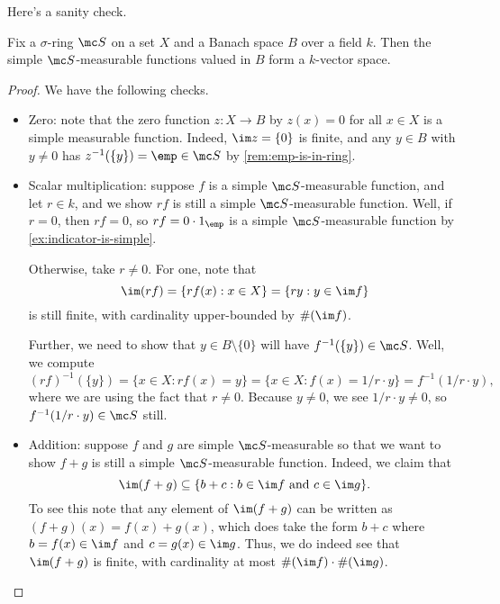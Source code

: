 \documentclass[../notes.tex]{subfiles}
\begin{document}
Here's a sanity check.
\begin{lemma} \label{lem:simple-meas-is-k-vec}
	Fix a $\sigma$-ring $\mc S$ on a set $X$ and a Banach space $B$ over a field $k$. Then the simple $\mc S$-measurable functions valued in $B$ form a $k$-vector space.
\end{lemma}
\begin{proof}
	We have the following checks.
	\begin{itemize}
		\item Zero: note that the zero function $z\colon X\to B$ by $z(x)=0$ for all $x\in X$ is a simple measurable function. Indeed, $\im z=\{0\}$ is finite, and any $y\in B$ with $y\ne0$ has $z^{-1}(\{y\})=\emp\in\mc S$ by \autoref{rem:emp-is-in-ring}.

		\item Scalar multiplication: suppose $f$ is a simple $\mc S$-measurable function, and let $r\in k$, and we show $rf$ is still a simple $\mc S$-measurable function. Well, if $r=0$, then $rf=0$, so $rf=0\cdot1_{\emp}$ is a simple $\mc S$-measurable function by \autoref{ex:indicator-is-simple}.
		
		Otherwise, take $r\ne0$. For one, note that
		\[\im(rf)=\{rf(x):x\in X\}=\{ry:y\in\im f\}\]
		is still finite, with cardinality upper-bounded by $\#(\im f)$.

		Further, we need to show that $y\in B\setminus\{0\}$ will have $f^{-1}(\{y\})\in\mc S$. Well, we compute
		\[(rf)^{-1}(\{y\})=\{x\in X:rf(x)=y\}=\{x\in X:f(x)=1/r\cdot y\}=f^{-1}(1/r\cdot y),\]
		where we are using the fact that $r\ne0$. Because $y\ne0$, we see $1/r\cdot y\ne0$, so $f^{-1}(1/r\cdot y)\in\mc S$ still.

		\item Addition: suppose $f$ and $g$ are simple $\mc S$-measurable so that we want to show $f+g$ is still a simple $\mc S$-measurable function. Indeed, we claim that
		\[\im(f+g)\subseteq\{b+c:b\in\im f\text{ and }c\in\im g\}.\]
		To see this note that any element of $\im(f+g)$ can be written as $(f+g)(x)=f(x)+g(x)$, which does take the form $b+c$ where $b=f(x)\in\im f$ and $c=g(x)\in\im g$. Thus, we do indeed see that $\im(f+g)$ is finite, with cardinality at most $\#(\im f)\cdot\#(\im g)$.


\end{itemize}
\end{proof}
\end{document}
